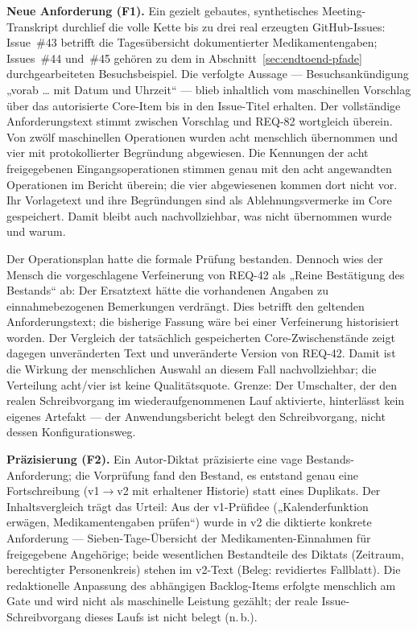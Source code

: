

\textbf{Neue Anforderung (F1).} Ein gezielt gebautes,
synthetisches Meeting-Transkript durchlief die volle Kette bis zu
drei real erzeugten GitHub-Issues: Issue~\#43 betrifft die
Tagesübersicht dokumentierter Medikamentengaben; Issues~\#44 und~\#45
gehören zu dem in Abschnitt~\ref{sec:endtoend-pfade}
durchgearbeiteten Besuchsbeispiel. Die verfolgte Aussage
--- Besuchsankündigung „vorab \ldots{} mit Datum und Uhrzeit`` ---
blieb inhaltlich vom maschinellen Vorschlag über das autorisierte
Core-Item bis in den Issue-Titel erhalten. Der vollständige
Anforderungstext stimmt zwischen Vorschlag und REQ-82 wortgleich
überein. Von zwölf maschinellen Operationen wurden acht menschlich
übernommen und vier mit protokollierter Begründung abgewiesen.
Die Kennungen der acht freigegebenen Eingangsoperationen stimmen
genau mit den acht angewandten Operationen im Bericht überein;
die vier abgewiesenen kommen dort nicht vor. Ihr Vorlagetext und
ihre Begründungen sind als Ablehnungsvermerke im Core gespeichert.
Damit bleibt auch nachvollziehbar, was nicht übernommen wurde
und warum.

Der Operationsplan hatte die formale Prüfung bestanden. Dennoch
wies der Mensch die vorgeschlagene Verfeinerung von REQ-42 als
„Reine Bestätigung des Bestands`` ab: Der Ersatztext hätte die
vorhandenen Angaben zu einnahmebezogenen Bemerkungen verdrängt.
Dies betrifft den geltenden Anforderungstext; die bisherige
Fassung wäre bei einer Verfeinerung historisiert worden. Der
Vergleich der tatsächlich gespeicherten Core-Zwischenstände zeigt
dagegen unveränderten Text und unveränderte Version von REQ-42.
Damit ist die Wirkung der menschlichen Auswahl an diesem Fall
nachvollziehbar; die Verteilung acht/vier ist keine Qualitätsquote.
Grenze: Der Umschalter, der
den realen Schreibvorgang im wiederaufgenommenen Lauf aktivierte,
hinterlässt kein eigenes Artefakt --- der Anwendungsbericht belegt den
Schreibvorgang, nicht dessen Konfigurationsweg.

\textbf{Präzisierung (F2).} Ein Autor-Diktat präzisierte eine
vage Bestands-Anforderung; die Vorprüfung fand den Bestand, es
entstand genau eine Fortschreibung (v1$\rightarrow$v2 mit
erhaltener Historie) statt eines Duplikats. Der Inhaltsvergleich
trägt das Urteil: Aus der v1-Prüfidee („Kalenderfunktion erwägen,
Medikamentengaben prüfen``) wurde in v2 die diktierte konkrete
Anforderung --- Sieben-Tage-Übersicht der Medikamenten-Einnahmen
für freigegebene Angehörige; beide wesentlichen Bestandteile des
Diktats (Zeitraum, berechtigter Personenkreis) stehen im v2-Text
(Beleg: revidiertes Fallblatt). Die redaktionelle
Anpassung des abhängigen Backlog-Items erfolgte menschlich am Gate
und wird nicht als maschinelle Leistung gezählt; der reale
Issue-Schreibvorgang dieses Laufs ist nicht belegt (n.\,b.).

